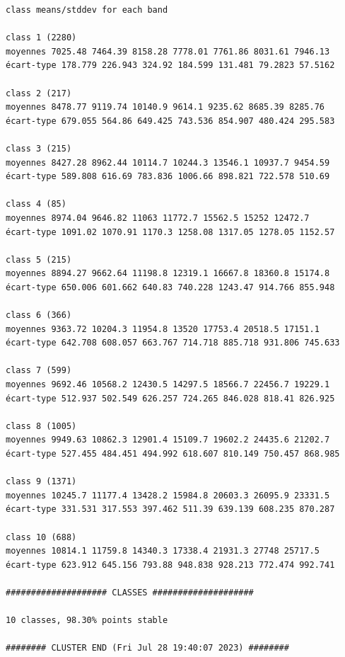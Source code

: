 \documentclass[land,article,submit,pdftex,moreauthors]{Definitions/mdpi}
\begin{document}
\begin{scriptsize}
\begin{verbatim}
class means/stddev for each band

class 1 (2280)
moyennes 7025.48 7464.39 8158.28 7778.01 7761.86 8031.61 7946.13
écart-type 178.779 226.943 324.92 184.599 131.481 79.2823 57.5162

class 2 (217)
moyennes 8478.77 9119.74 10140.9 9614.1 9235.62 8685.39 8285.76
écart-type 679.055 564.86 649.425 743.536 854.907 480.424 295.583

class 3 (215)
moyennes 8427.28 8962.44 10114.7 10244.3 13546.1 10937.7 9454.59
écart-type 589.808 616.69 783.836 1006.66 898.821 722.578 510.69

class 4 (85)
moyennes 8974.04 9646.82 11063 11772.7 15562.5 15252 12472.7
écart-type 1091.02 1070.91 1170.3 1258.08 1317.05 1278.05 1152.57

class 5 (215)
moyennes 8894.27 9662.64 11198.8 12319.1 16667.8 18360.8 15174.8
écart-type 650.006 601.662 640.83 740.228 1243.47 914.766 855.948

class 6 (366)
moyennes 9363.72 10204.3 11954.8 13520 17753.4 20518.5 17151.1
écart-type 642.708 608.057 663.767 714.718 885.718 931.806 745.633

class 7 (599)
moyennes 9692.46 10568.2 12430.5 14297.5 18566.7 22456.7 19229.1
écart-type 512.937 502.549 626.257 724.265 846.028 818.41 826.925

class 8 (1005)
moyennes 9949.63 10862.3 12901.4 15109.7 19602.2 24435.6 21202.7
écart-type 527.455 484.451 494.992 618.607 810.149 750.457 868.985

class 9 (1371)
moyennes 10245.7 11177.4 13428.2 15984.8 20603.3 26095.9 23331.5
écart-type 331.531 317.553 397.462 511.39 639.139 608.235 870.287

class 10 (688)
moyennes 10814.1 11759.8 14340.3 17338.4 21931.3 27748 25717.5
écart-type 623.912 645.156 793.88 948.838 928.213 772.474 992.741

#################### CLASSES ####################

10 classes, 98.30% points stable

######## CLUSTER END (Fri Jul 28 19:40:07 2023) ########

\end{verbatim}
\end{scriptsize}
\end{document}
